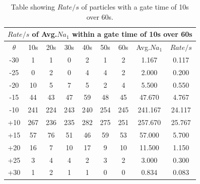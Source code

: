 \documentclass[12pt]{article}
\begin{document}
\begin{table}[H]
\begin{center}
 \footnotesize
 \begin{tabular}{|c||c|c|c|c|c|c||c||c|}
 \hline
 \multicolumn{9}{|c|}{$Rate/s$ of Avg.$Na_1$ within a gate time of 10s over 60s} \\
 \hline \hline
  $\theta$ & 10s & 20s & 30s & 40s & 50s & 60s & Avg.$Na_1$ & $Rate/s$ \\
 \hline
 \hline
 -30 & 1 & 1 & 0 & 2 & 1 & 2 & 1.167 & 0.117 \\
 \hline
 -25 & 0 & 2 & 0 & 4 & 4 & 2 & 2.000 & 0.200 \\
 \hline
 -20 & 10 & 5 & 7 & 5 & 2 & 4 & 5.500 & 0.550 \\
 \hline
 -15 & 44 &43 & 47 & 59 & 48 & 45 & 47.670 & 4.767 \\
 \hline
 -10 & 241 & 224 & 243 & 240 & 254 & 245 & 241.167 & 24.117 \\
 \hline 
 \hline
 +10 & 267 & 236 & 235 & 282 & 275 & 251 & 257.670 & 25.767 \\
 \hline
 +15 & 57 & 76 & 51 & 46 & 59 & 53 & 57.000 & 5.700 \\
 \hline
 +20 & 16 & 7 & 10 & 17 & 9 & 10 & 11.500 & 1.150 \\
 \hline
 +25 & 3 & 4 & 4 & 2 & 3 & 2 & 3.000 & 0.300 \\
 \hline
 +30 & 1 & 2 & 1 & 1 & 0 & 0 & 0.834 & 0.083 \\
 \hline
 \end{tabular}
 \caption{Table showing $Rate/s$ of particles with a gate time of 10s over 60s.}
 \label{2.1.1 Table Appendix}
\end{center}
\end{table}
\end{document}
